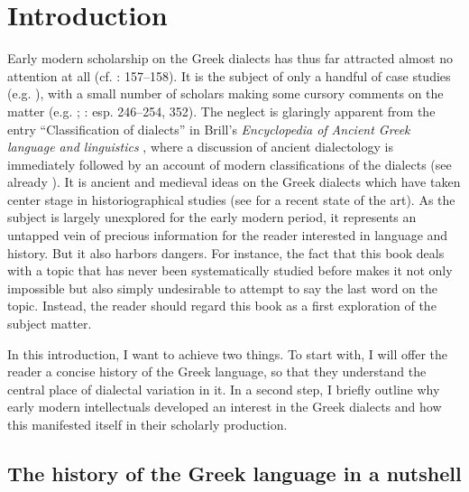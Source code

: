 \chapter{Introduction}\label{chap:1}

Early modern scholarship on the Greek dialects has thus far attracted almost no attention at all (cf. \citealt{Ben-Tov2009}: 157–158). It is the subject of only a handful of case studies (e.g. \citealt{VanRooy2016c}), with a small number of scholars making some cursory comments on the matter (e.g. \citealt{Botley2010}; \citealt{Roelcke2014}: esp. 246–254, 352). The neglect is glaringly apparent from the entry “Classification of dialects” in Brill’s \textit{Encyclopedia of Ancient Greek language and linguistics} \citep{Finkelberg2014}, where a discussion of ancient dialectology is immediately followed by an account of modern classifications of the dialects (see already \citealt{VanRooy2016a}). It is ancient and medieval ideas on the Greek dialects which have taken center stage in historiographical studies (see \citealt{VanRooy2018b} for a recent state of the art). As the subject is largely unexplored for the early modern period, it represents an untapped vein of precious information for the reader interested in language and history. But it also harbors dangers. For instance, the fact that this book deals with a topic that has never been systematically studied before makes it not only impossible but also simply undesirable to attempt to say the last word on the topic. Instead, the reader should regard this book as a first exploration of the subject matter.

In this introduction, I want to achieve two things. To start with, I will offer the reader a concise history of the Greek language, so that they understand the central place of dialectal variation in it. In a second step, I briefly outline why early modern intellectuals developed an interest in the Greek dialects and how this manifested itself in their scholarly production.

\section{The history of the Greek language in a nutshell}\label{sec:1.1}

